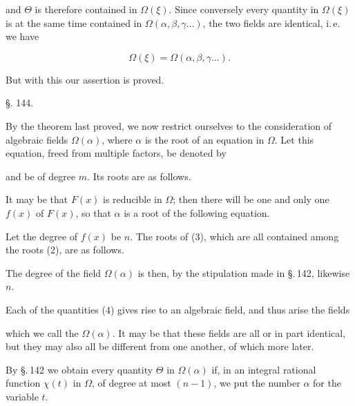 

and $\Theta$ is therefore contained in $\Omega(\xi)$. Since conversely every
quantity in $\Omega(\xi)$ is at the same time contained in $\Omega(\alpha, \beta, \gamma \dots)$, the
two fields are identical, i.\,e. we have

\[
\Omega(\xi) = \Omega(\alpha, \beta, \gamma \dots).
\]

But with this our assertion is proved.

\begin{center}
§. 144.

\end{center}

By the theorem last proved, we now restrict ourselves to
the consideration of algebraic fields $\Omega(\alpha)$, where $\alpha$
is the root of an equation in $\Omega$. Let this equation,
freed from multiple factors, be denoted by


and be of degree $m$. Its roots are as follows.


It may be that $F(x)$ is reducible in $\Omega$; then there will be one and
only one  $f(x)$ of $F(x)$, so
that $\alpha$ is a root of the following equation.


Let the degree of $f(x)$ be $n$. The roots of (3), which are all
contained among the roots (2), are as follows.


The degree of the field $\Omega(\alpha)$ is then, by the stipulation
made in §.\,142, likewise $n$.

Each of the quantities (4) gives rise to an algebraic field,
and thus arise the fields


which we call the  $\Omega(\alpha)$. It may
be that these fields are all or in part identical, but they
may also all be different from one another, of which more
later.

By §.\,142 we obtain every quantity $\Theta$ in $\Omega(\alpha)$ if, in an
integral rational function $\chi(t)$ in $\Omega$, of degree at most
$(n-1)$, we put the number $\alpha$ for the variable $t$.
